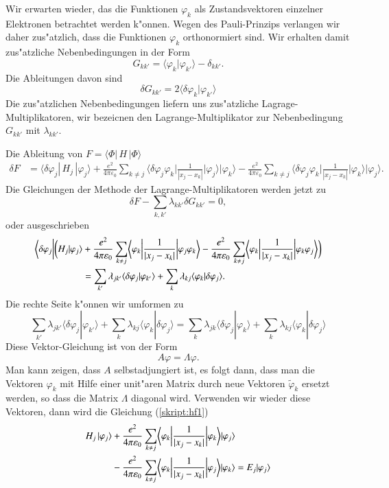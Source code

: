 Wir erwarten wieder, das die Funktionen $\varphi_k$ als Zustandsvektoren
einzelner Elektronen betrachtet werden k"onnen.
Wegen des Pauli-Prinzips verlangen wir daher zus"atzlich, dass die
Funktionen $\varphi_k$ orthonormiert sind.
Wir erhalten damit zus"atzliche Nebenbedingungen in der Form
\[
G_{kk'}=\langle\varphi_k|\varphi_{k'}\rangle-\delta_{kk'}.
\]
Die Ableitungen davon sind
\[
\delta G_{kk'}
=
2\langle\delta\varphi_k |\varphi_{k'}\rangle
\]
Die zus"atzlichen Nebenbedingungen liefern uns zus"atzliche
Lagrage-Multiplikatoren, wir bezeicnen den Lagrange-Multiplikator
zur Nebenbedingung $G_{kk'}$ mit $\lambda_{kk'}$.

Die Ableitung von $F=\langle\Phi|\,H\,|\Phi\rangle$
\begin{align*}
\delta F
&=
\langle\delta\varphi_j|\,H_j\,|\varphi_j\rangle
+
\frac{e^2}{4\pi\varepsilon_0}
\sum_{k\ne j}
\biggl\langle\delta\varphi_j\varphi_k\biggr|
\frac{1}{|x_j-x_k|}
\biggl|\varphi_j\bigg\rangle\bigg|\varphi_k\biggr\rangle
-
\frac{e^2}{4\pi\varepsilon_0}
\sum_{k\ne j}
\biggl\langle\delta\varphi_j\varphi_k\biggr|
\frac{1}{|x_j-x_k|}
\biggl|\varphi_k\bigg\rangle\bigg|\varphi_j\biggr\rangle.
\end{align*}
Die Gleichungen der Methode der Lagrange-Multiplikatoren werden 
jetzt zu
\[
\delta F - \sum_{k,k'}\lambda_{kk'}\delta G_{kk'}=0,
\]
oder ausgeschrieben
\begin{align}
\bigg\langle\delta\varphi_j\bigg|
\bigg(
H_j|\varphi_j\rangle
&+
\frac{e^2}{4\pi\varepsilon_0}
\sum_{k\ne j}
\biggl\langle\varphi_k\biggr|
\frac{1}{|x_j-x_k|}
\biggl|\varphi_j\varphi_k\biggr\rangle
\notag
-
\frac{e^2}{4\pi\varepsilon_0}
\sum_{k\ne j}
\biggl\langle\varphi_k\biggr|
\frac{1}{|x_j-x_k|}
\biggl|\varphi_k\varphi_j\biggr\rangle
\biggr)
\\
\qquad\qquad
&=
\sum_{k'}\lambda_{jk'}\langle\delta\varphi_j|\varphi_{k'}\rangle
+
\sum_{k}\lambda_{kj}\langle\varphi_k|\delta\varphi_j\rangle.
\label{skript:hf1}
\end{align}
Die rechte Seite k"onnen wir umformen zu
\[
\sum_{k'}\lambda_{jk'}\langle\delta\varphi_j|\varphi_{k'}\rangle
+
\sum_{k}\lambda_{kj}\langle\varphi_k|\delta\varphi_j\rangle
=
\sum_{k}\lambda_{jk}\langle\delta\varphi_j|\varphi_k\rangle
+
\sum_{k}\lambda_{kj}\langle\varphi_k|\delta\varphi_j\rangle
\]
Diese Vektor-Gleichung ist von der Form
\[
A\varphi = \Lambda \varphi.
\]
Man kann zeigen, dass $A$ selbstadjungiert ist, es folgt dann, dass
man die Vektoren $\varphi_k$ mit Hilfe einer unit"aren Matrix durch
neue Vektoren $\tilde\varphi_k$ ersetzt werden, so dass die
Matrix $\Lambda$ diagonal wird.
Verwenden wir wieder diese Vektoren, dann wird die Gleichung
(\ref{skript:hf1}) 
\begin{align}
H_j\,|\varphi_j\rangle
&+
\frac{e^2}{4\pi\varepsilon_0}
\sum_{k\ne j}
\biggl\langle\varphi_k\biggr|
\frac{1}{|x_j-x_k|}
\biggl|\varphi_k\bigg\rangle
|\varphi_j\rangle
\notag
\\
&-
\frac{e^2}{4\pi\varepsilon_0}
\sum_{k\ne j}
\biggl\langle\varphi_k\biggr|
\frac{1}{|x_j-x_k|}
\biggl|\varphi_j\bigg\rangle
|\varphi_k\rangle
=
E_j
| \varphi_j\rangle
\label{skript:hf2}
\end{align}







